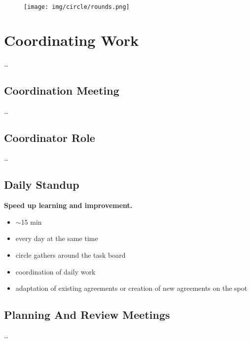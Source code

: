 \begin{figure}[htbp]
\centering
\texttt{[image: img/circle/rounds.png]}
\end{figure}

\chapter{Coordinating Work}
\label{coordinatingwork}

{\ldots}

\section{Coordination Meeting}
\label{coordinationmeeting}

{\ldots}

\section{Coordinator Role}
\label{coordinatorrole}

{\ldots}

\section{Daily Standup}
\label{dailystandup}

\textbf{Speed up learning and improvement.}

\begin{itemize}
\item \ensuremath{\sim}15 min

\item every day at the same time

\item circle gathers around the task board

\item coordination of daily work

\item adaptation of existing agreements or creation of new agreements on the spot

\end{itemize}

\section{Planning And Review Meetings}
\label{planningandreviewmeetings}

{\ldots}

